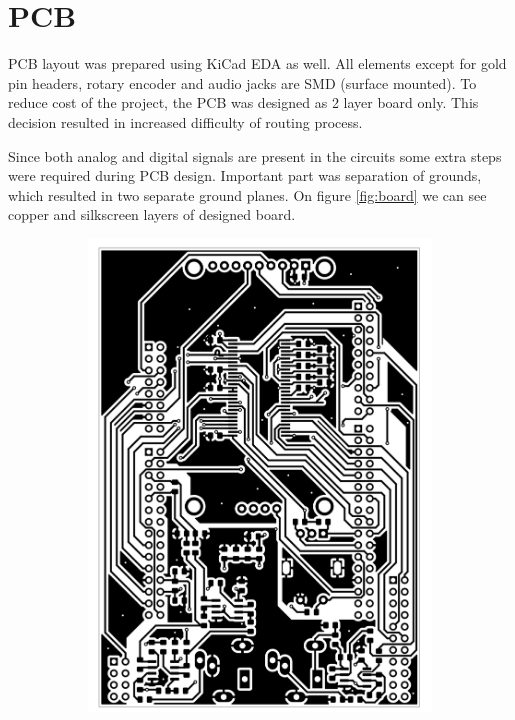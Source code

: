 \documentclass[a4paper,twoside,12pt]{book}
\begin{document}
\section{PCB}
PCB layout was prepared using KiCad EDA as well.
All elements except for gold pin headers,
rotary encoder and audio jacks are SMD (surface mounted).
To reduce cost of the project, the PCB was designed as 2 layer board only.
This decision resulted in increased difficulty of routing process.

Since both analog and digital signals are present in the circuits
some extra steps were required during PCB design.
Important part was separation of grounds,
which resulted in two separate ground planes.
On figure \ref{fig:board} we can see copper and 
silkscreen layers of designed board.

\begin{figure}[H]
    \centering
    \begin{subfigure}[h]{0.273\textwidth}
        \includegraphics[width=\textwidth]{images/Board_front}

\end{subfigure}
\end{figure}
\end{document}
